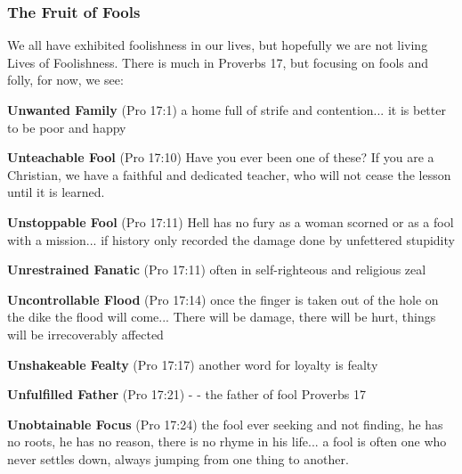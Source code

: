 \subsubsection{The Fruit of Fools}
We all have exhibited foolishness in our lives, but hopefully we are not living Lives of Foolishness. There is much in Proverbs 17, but focusing on fools and folly, for now, we see:%
\begin{compactenum}[I.][8]
    \item \textbf{Unwanted Family} (Pro 17:1)  a home full of strife and contention... it is better to be poor and happy 
    \item \textbf{Unteachable Fool} (Pro 17:10) Have you ever been one of these? If you are a Christian, we have a faithful and dedicated teacher, who will not cease the lesson until it is learned.  
    \item \textbf{Unstoppable Fool} (Pro 17:11)  Hell has no fury as a woman scorned or as a fool with a mission... if history only recorded the damage done by unfettered stupidity 
    \item \textbf{Unrestrained Fanatic} (Pro 17:11) often in self-righteous and religious zeal  
    \item \textbf{Uncontrollable Flood} (Pro 17:14)  once the finger is taken out of the hole on the dike the flood will come... There will be damage, there will be hurt, things will be irrecoverably affected 
    \item \textbf{Unshakeable Fealty} (Pro 17:17)  another word for loyalty is fealty 
    \item \textbf{Unfulfilled Father} (Pro 17:21) - - the father of fool Proverbs 17 
    \item \textbf{Unobtainable Focus} (Pro 17:24)  the fool ever seeking and not finding, he has no roots, he has no reason, there is no rhyme in his life... a fool is often one who never settles down, always jumping from one thing to another. 
\end{compactenum}